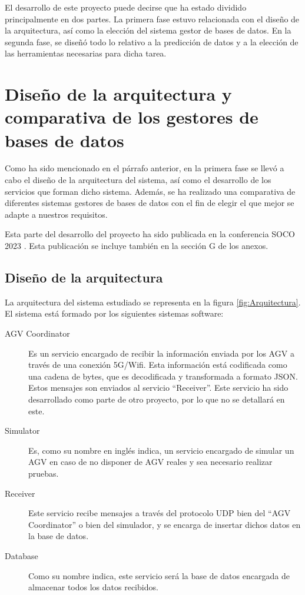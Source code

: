 
El desarrollo de este proyecto puede decirse que ha estado dividido principalmente en dos partes. La primera
fase estuvo relacionada con el diseño de la arquitectura, así como la elección del sistema gestor de bases de
datos. En la segunda fase, se diseñó todo lo relativo a la predicción de datos y a la elección de las
herramientas necesarias para dicha tarea.

\section{Diseño de la arquitectura y comparativa de los gestores de bases de datos}

Como ha sido mencionado en el párrafo anterior, en la primera fase se llevó a cabo el diseño de la
arquitectura del sistema, así como el desarrollo de los servicios que forman dicho sistema. Además,
se ha realizado una comparativa de diferentes sistemas gestores de bases de datos con el fin de elegir
el que mejor se adapte a nuestros requisitos.

Esta parte del desarrollo del proyecto ha sido publicada en la conferencia SOCO 2023 \cite{8364SOCO}. Esta publicación 
se incluye también en la sección G de los anexos.

\subsection{Diseño de la arquitectura}

La arquitectura del sistema estudiado se representa en la figura \ref{fig:Arquitectura}. El sistema
está formado por los siguientes sistemas software:
\begin{description}
    \item [AGV Coordinator] Es un servicio encargado de recibir la información enviada por los AGV a
        través de una conexión 5G/Wifi. Esta información está codificada como una cadena de bytes, que
        es decodificada y transformada a formato JSON. Estos mensajes son enviados al servicio 
        ``Receiver''. Este servicio ha sido desarrollado como parte de otro proyecto, por lo que no
        se detallará en este.
    \item [Simulator] Es, como su nombre en inglés indica, un servicio encargado de simular un AGV
        en caso de no disponer de AGV reales y sea necesario realizar pruebas.
    \item [Receiver] Este servicio recibe mensajes a través del protocolo UDP bien del ``AGV Coordinator''
        o bien del simulador, y se encarga de insertar dichos datos en la base de datos.
    \item [Database] Como su nombre indica, este servicio será la base de datos encargada de almacenar
        todos los datos recibidos.
\end{description}

